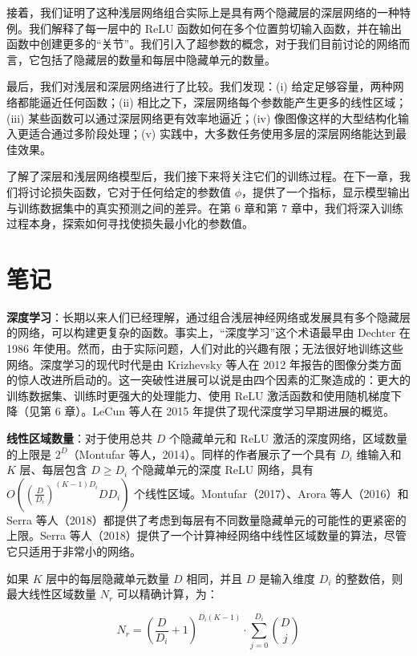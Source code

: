 \documentclass[lang=cn,newtx,10pt,scheme=chinese]{elegantbook}
\begin{document}
接着，我们证明了这种浅层网络组合实际上是具有两个隐藏层的深层网络的一种特例。我们解释了每一层中的 ReLU 函数如何在多个位置剪切输入函数，并在输出函数中创建更多的“关节”。我们引入了超参数的概念，对于我们目前讨论的网络而言，它包括了隐藏层的数量和每层中隐藏单元的数量。

最后，我们对浅层和深层网络进行了比较。我们发现：(i) 给定足够容量，两种网络都能逼近任何函数；(ii) 相比之下，深层网络每个参数能产生更多的线性区域；(iii) 某些函数可以通过深层网络更有效率地逼近；(iv) 像图像这样的大型结构化输入更适合通过多阶段处理；(v) 实践中，大多数任务使用多层的深层网络能达到最佳效果。

了解了深层和浅层网络模型后，我们接下来将关注它们的训练过程。在下一章，我们将讨论损失函数，它对于任何给定的参数值 \(\phi\)，提供了一个指标，显示模型输出与训练数据集中的真实预测之间的差异。在第 6 章和第 7 章中，我们将深入训练过程本身，探索如何寻找使损失最小化的参数值。


\section{笔记}
\textbf{深度学习}：长期以来人们已经理解，通过组合浅层神经网络或发展具有多个隐藏层的网络，可以构建更复杂的函数。事实上，“深度学习”这个术语最早由 Dechter 在 1986 年使用。然而，由于实际问题，人们对此的兴趣有限；无法很好地训练这些网络。深度学习的现代时代是由 Krizhevsky 等人在 2012 年报告的图像分类方面的惊人改进所启动的。这一突破性进展可以说是由四个因素的汇聚造成的：更大的训练数据集、训练时更强大的处理能力、使用 ReLU 激活函数和使用随机梯度下降（见第 6 章）。LeCun 等人在 2015 年提供了现代深度学习早期进展的概览。

\textbf{线性区域数量}：对于使用总共 \(D\) 个隐藏单元和 ReLU 激活的深度网络，区域数量的上限是 \(2^D\)（Montufar 等人，2014）。同样的作者展示了一个具有 \(D_i\) 维输入和 \(K\) 层、每层包含 \(D \geq D_i\) 个隐藏单元的深度 ReLU 网络，具有 \(O\left(\left(\frac{D}{D_i}\right)^{(K-1)D_i}D D_i\right)\) 个线性区域。Montufar（2017）、Arora 等人（2016）和 Serra 等人（2018）都提供了考虑到每层有不同数量隐藏单元的可能性的更紧密的上限。Serra 等人（2018）提供了一个计算神经网络中线性区域数量的算法，尽管它只适用于非常小的网络。

如果 \(K\) 层中的每层隐藏单元数量 \(D\) 相同，并且 \(D\) 是输入维度 \(D_i\) 的整数倍，则最大线性区域数量 \(N_r\) 可以精确计算，为：

\begin{equation}
N_r = \left( \frac{D}{D_i} + 1 \right)^{D_i(K-1)} \cdot \sum_{j=0}^{D_i} \binom{D}{j} 
\end{equation}
\end{document}

